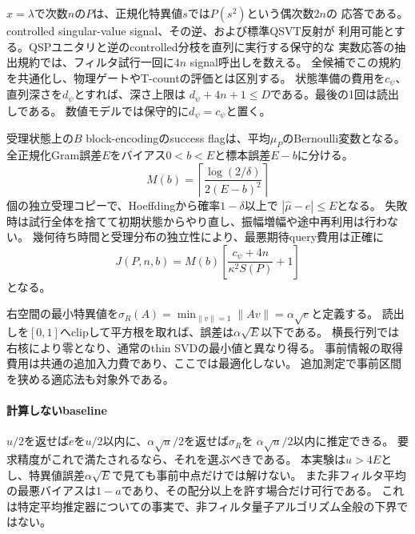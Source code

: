 \documentclass[11pt,a4paper]{article}
\begin{document}
$x=\lambda$で次数$n$の$P$は、正規化特異値$s$では$P(s^2)$という偶次数$2n$の
応答である。controlled singular-value signal、その逆、および標準QSVT反射が
利用可能とする。QSPユニタリと逆のcontrolled分枝を直列に実行する保守的な
実数応答の抽出規約では、フィルタ試行一回に$4n$ signal呼出しを数える。
全候補でこの規約を共通化し、物理ゲートやT-countの評価とは区別する。
状態準備の費用を$c_\psi$、直列深さを$d_\psi$とすれば、深さ上限は
$d_\psi+4n+1\leq D$である。最後の1回は読出しである。
数値モデルでは保守的に$d_\psi=c_\psi$と置く。

受理状態上の$B$ block-encodingのsuccess flagは、平均$\mu_P$のBernoulli変数となる。
全正規化Gram誤差$E$をバイアス$0<b<E$と標本誤差$E-b$に分ける。
\begin{equation}\label{eq:shots}
 M(b)=\left\lceil\frac{\log(2/\delta)}{2(E-b)^2}\right\rceil
\end{equation}
個の独立受理コピーで、Hoeffdingから確率$1-\delta$以上で
$|\widehat\mu-e|\leq E$となる。
失敗時は試行全体を捨てて初期状態からやり直し、振幅増幅や途中再利用は行わない。
幾何待ち時間と受理分布の独立性により、最悪期待query費用は正確に
\begin{equation}\label{eq:cost}
 J(P,n,b)=M(b)\left[\frac{c_\psi+4n}{\kappa^2S(P)}+1\right]
\end{equation}
となる。

右空間の最小特異値を$\sigma_R(A)=\min_{\|v\|=1}\|Av\|=\alpha\sqrt e$と定義する。
読出しを$[0,1]$へclipして平方根を取れば、誤差は$\alpha\sqrt E$以下である。
横長行列では右核により零となり、通常のthin SVDの最小値と異なり得る。
事前情報の取得費用は共通の追加入力費であり、ここでは最適化しない。
追加測定で事前区間を狭める適応法も対象外である。

\paragraph{計算しないbaseline}
$u/2$を返せば$e$を$u/2$以内に、$\alpha\sqrt u/2$を返せば$\sigma_R$を
$\alpha\sqrt u/2$以内に推定できる。
要求精度がこれで満たされるなら、それを選ぶべきである。
本実験は$u>4E$とし、特異値誤差$\alpha\sqrt E$で見ても事前中点だけでは解けない。
また非フィルタ平均の最悪バイアスは$1-a$であり、その配分以上を許す場合だけ可行である。
これは特定平均推定器についての事実で、非フィルタ量子アルゴリズム全般の下界ではない。
\end{document}
